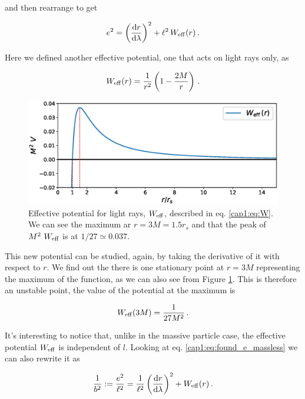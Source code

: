 and then rearrange to get

\begin{equation}
    e^2 = \left( \dv{r}{\lambda} \right)^2 + \ell^2 \, W_{\rm eff} (r) \, .
    \label{cap1:eq:found_e_massless}
\end{equation}

Here we defined another effective potential, one that acts on light rays only,
as

\begin{equation}
    W_{\rm eff} (r) = \frac{1}{r^2} \left( 1 - \frac{2M}{r} \right) \, .
    \label{cap1:eq:W}
\end{equation}

\begin{figure}[h!]
    \centering
    \includegraphics[width = 0.85 \textwidth]{Figures/chapter1/W_eff.eps}
    \caption{Effective potential for light rays, $W_{\rm eff}$, described in eq.
        \ref{cap1:eq:W}.
    We can see the maximum ar $r = 3M = 1.5 r_s$ and that the peak of
    $M^2 ~ W_{\rm eff}$ is at $1 / 27 \simeq 0.037$.}
    \label{ca1:fig:W_eff}
\end{figure}

This new potential can be studied, again, by taking the derivative of it with
respect to $r$.
We find out the there is one stationary point at $r = 3M$ representing
the maximum of the function, as we can also see from Figure \ref{ca1:fig:W_eff}.
This is therefore an unstable point, the value of the potential at the maximum
is

\begin{equation*}
    W_{\rm eff} (3 M) = \frac{1}{27 M^2} \, .
    \label{cap1:eq:max_W_eff}
\end{equation*}

It's interesting to notice that, unlike in the massive particle case, the
effective potential $W_{\rm eff}$ is independent of $l$.
Looking at eq. \ref{cap1:eq:found_e_massless} we can also rewrite it as

\begin{equation}
    \frac{1}{b^2} := \frac{e^2}{\ell^2}
    = \frac{1}{\ell^2} \left( \dv{r}{\lambda} \right)^2 + W_{\rm eff} (r) \, .
    \label{cap1:eq:found_b}
\end{equation}

